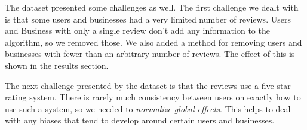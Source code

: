 The dataset presented some challenges as well. The first challenge we dealt with
is that some users and businesses had a very limited number of reviews. Users
and Business with only a single review don't add any information to the
algorithm, so we removed those. We also added a method for removing users and
businesses with fewer than an arbitrary number of reviews. The effect of this is
shown in the results section.

The next challenge presented by the dataset is that the reviews use a five-star
rating system. There is rarely much consistency between users on exactly how to
use such a system, so we needed to \emph{normalize global effects}. This helps
to deal with any biases that tend to develop around certain users and
businesses. 

